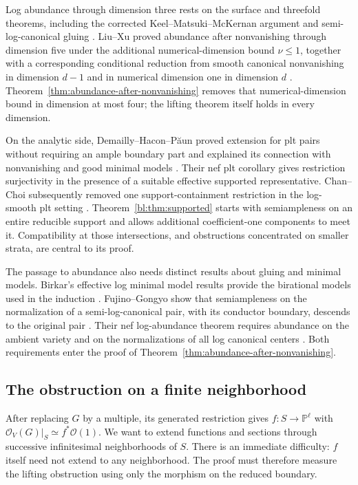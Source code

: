 Log abundance through dimension three rests on the surface and threefold
theorems, including the corrected Keel--Matsuki--McKernan argument
\cite{KMM1994,KMM2004,Fujino2012} and semi-log-canonical gluing
\cite{Fujino2000}. Liu--Xu proved abundance after nonvanishing through
dimension five under the additional numerical-dimension bound
$\nu\leq1$, together with a corresponding conditional reduction from
smooth canonical nonvanishing in dimension $d-1$ and in numerical
dimension one in dimension $d$
\cite[Theorems~5.1 and~5.4]{LiuXu2025}. Theorem~\ref{thm:abundance-after-nonvanishing}
removes that numerical-dimension bound in dimension at most four;
the lifting theorem itself holds in every dimension.

On the analytic side, Demailly--Hacon--P\u{a}un proved extension for
plt pairs without requiring an ample boundary part and explained its
connection with nonvanishing and good minimal models
\cite[Theorem 1.7 and Corollary 1.8]{DHP2013}. Their nef plt
corollary gives restriction surjectivity in the presence of a suitable
effective supported representative. Chan--Choi subsequently removed
one support-containment restriction in the log-smooth plt setting
\cite[Theorem 1.6.1]{ChanChoi2021}. Theorem~\ref{bl:thm:supported}
starts with semiampleness on an entire reducible support and allows
additional coefficient-one components to meet it. Compatibility at
those intersections, and obstructions concentrated on smaller strata,
are central to its proof.

The passage to abundance also needs distinct results about gluing and
minimal models. Birkar's effective log minimal model results provide
the birational models used in the induction
\cite{Birkar2010,Birkar2011}. Fujino--Gongyo show that semiampleness
on the normalization of a semi-log-canonical pair, with its conductor
boundary, descends to the original pair
\cite[Theorem 4.3]{FujinoGongyo2014}. Their nef log-abundance theorem
requires abundance on the ambient variety and on the normalizations of
all log canonical centers \cite[Theorem 4.2]{FujinoGongyo2014}.
Both requirements enter the proof of Theorem~\ref{thm:abundance-after-nonvanishing}.

\subsection*{The obstruction on a finite neighborhood}

After replacing $G$ by a multiple, its generated restriction gives
$f:S\to\mathbb P^\ell$ with
$\mathcal O_V(G)|_S\simeq f^*\mathcal O(1)$. We want to extend
functions and sections through successive infinitesimal neighborhoods
of $S$. There is an immediate difficulty: $f$ itself need not extend
to any neighborhood. The proof must therefore measure the lifting
obstruction using only the morphism on the reduced boundary.

